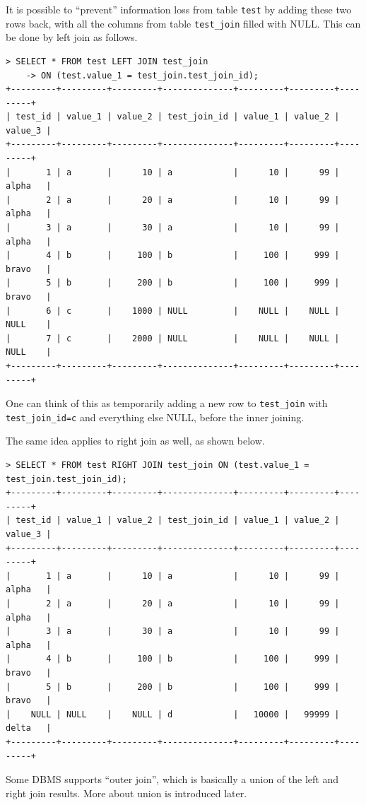 It is possible to ``prevent'' information loss from table \verb|test| by adding these two rows back, with all the columns from table \verb|test_join| filled with NULL. This can be done by left join as follows.
\begin{lstlisting}
> SELECT * FROM test LEFT JOIN test_join
    -> ON (test.value_1 = test_join.test_join_id);
+---------+---------+---------+--------------+---------+---------+---------+
| test_id | value_1 | value_2 | test_join_id | value_1 | value_2 | value_3 |
+---------+---------+---------+--------------+---------+---------+---------+
|       1 | a       |      10 | a            |      10 |      99 | alpha   |
|       2 | a       |      20 | a            |      10 |      99 | alpha   |
|       3 | a       |      30 | a            |      10 |      99 | alpha   |
|       4 | b       |     100 | b            |     100 |     999 | bravo   |
|       5 | b       |     200 | b            |     100 |     999 | bravo   |
|       6 | c       |    1000 | NULL         |    NULL |    NULL | NULL    |
|       7 | c       |    2000 | NULL         |    NULL |    NULL | NULL    |
+---------+---------+---------+--------------+---------+---------+---------+
\end{lstlisting}
One can think of this as temporarily adding a new row to \verb|test_join| with \verb|test_join_id=c| and everything else NULL, before the inner joining.

The same idea applies to right join as well, as shown below.
\begin{lstlisting}
> SELECT * FROM test RIGHT JOIN test_join ON (test.value_1 = test_join.test_join_id);
+---------+---------+---------+--------------+---------+---------+---------+
| test_id | value_1 | value_2 | test_join_id | value_1 | value_2 | value_3 |
+---------+---------+---------+--------------+---------+---------+---------+
|       1 | a       |      10 | a            |      10 |      99 | alpha   |
|       2 | a       |      20 | a            |      10 |      99 | alpha   |
|       3 | a       |      30 | a            |      10 |      99 | alpha   |
|       4 | b       |     100 | b            |     100 |     999 | bravo   |
|       5 | b       |     200 | b            |     100 |     999 | bravo   |
|    NULL | NULL    |    NULL | d            |   10000 |   99999 | delta   |
+---------+---------+---------+--------------+---------+---------+---------+
\end{lstlisting}

Some DBMS supports ``outer join'', which is basically a union of the left and right join results. More about union is introduced later.

